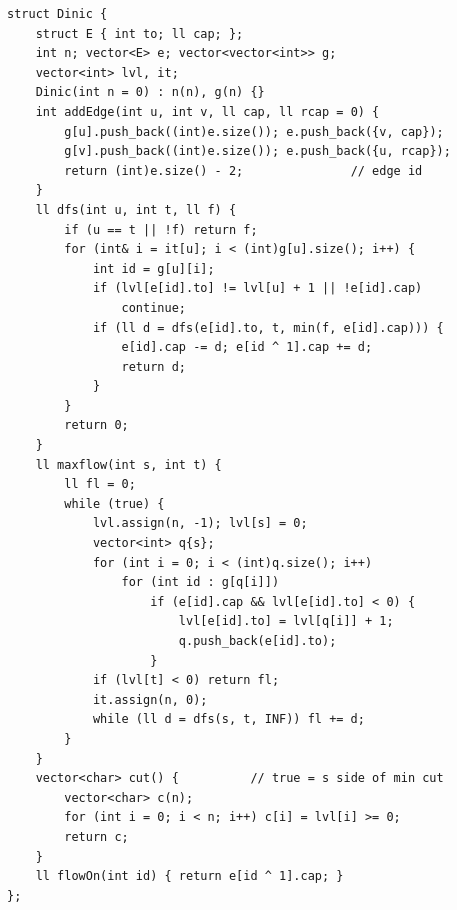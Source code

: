 \begin{lstlisting}
struct Dinic {
    struct E { int to; ll cap; };
    int n; vector<E> e; vector<vector<int>> g;
    vector<int> lvl, it;
    Dinic(int n = 0) : n(n), g(n) {}
    int addEdge(int u, int v, ll cap, ll rcap = 0) {
        g[u].push_back((int)e.size()); e.push_back({v, cap});
        g[v].push_back((int)e.size()); e.push_back({u, rcap});
        return (int)e.size() - 2;               // edge id
    }
    ll dfs(int u, int t, ll f) {
        if (u == t || !f) return f;
        for (int& i = it[u]; i < (int)g[u].size(); i++) {
            int id = g[u][i];
            if (lvl[e[id].to] != lvl[u] + 1 || !e[id].cap)
                continue;
            if (ll d = dfs(e[id].to, t, min(f, e[id].cap))) {
                e[id].cap -= d; e[id ^ 1].cap += d;
                return d;
            }
        }
        return 0;
    }
    ll maxflow(int s, int t) {
        ll fl = 0;
        while (true) {
            lvl.assign(n, -1); lvl[s] = 0;
            vector<int> q{s};
            for (int i = 0; i < (int)q.size(); i++)
                for (int id : g[q[i]])
                    if (e[id].cap && lvl[e[id].to] < 0) {
                        lvl[e[id].to] = lvl[q[i]] + 1;
                        q.push_back(e[id].to);
                    }
            if (lvl[t] < 0) return fl;
            it.assign(n, 0);
            while (ll d = dfs(s, t, INF)) fl += d;
        }
    }
    vector<char> cut() {          // true = s side of min cut
        vector<char> c(n);
        for (int i = 0; i < n; i++) c[i] = lvl[i] >= 0;
        return c;
    }
    ll flowOn(int id) { return e[id ^ 1].cap; }
};
\end{lstlisting}


